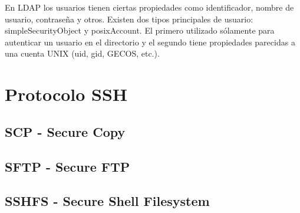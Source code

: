 En LDAP los usuarios tienen ciertas propiedades como identificador, nombre de usuario, contrase\~{n}a y otros. Existen dos tipos principales de usuario: simpleSecurityObject y posixAccount. El primero utilizado s\'{o}lamente para autenticar un usuario en el directorio y el segundo tiene propiedades parecidas a una cuenta UNIX (uid, gid, GECOS, etc.).

\section {Protocolo SSH}
  \subsection {SCP - Secure Copy}
  \subsection {SFTP - Secure FTP}
  \subsection {SSHFS - Secure Shell Filesystem}

